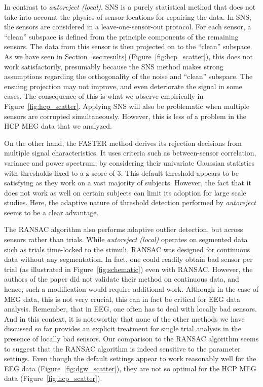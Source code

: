 In contrast to \emph{autoreject (local)}, SNS is a purely statistical method that does not take into account the physics of sensor locations for repairing the data. In SNS, the sensors are considered in a leave-one-sensor-out protocol. For each sensor, a ``clean'' subspace is defined from the principle components of the remaining sensors. The data from this sensor is then projected on to the ``clean'' subspace. As we have seen in Section~\ref{sec:results} (Figure~\ref{fig:hcp_scatter}), this does not work satisfactorily, presumably because the SNS method makes strong assumptions regarding the orthogonality of the noise and ``clean'' subspace. The ensuing projection may not improve, and even deteriorate the signal in some cases. The consequence of this is what we observe empirically in Figure~\ref{fig:hcp_scatter}. Applying SNS will also be problematic when multiple sensors are corrupted simultaneously. However, this is less of a problem in the HCP MEG data that we analyzed. 

On the other hand, the FASTER method derives its rejection decisions from multiple signal characteristics. It uses criteria such as between-sensor correlation, variance and power spectrum, by considering their univariate Gaussian statistics with thresholds fixed to a z-score of 3. This default threshold appears to be satisfying as they work on a vast majority of subjects. However, the fact that it does not work as well on certain subjects can limit its adoption for large scale studies. Here, the adaptive nature of threshold detection performed by \emph{autoreject} seems to be a clear advantage.

The RANSAC algorithm also performs adaptive outlier detection, but across sensors rather than trials. While \emph{autoreject (local)} operates on segmented data such as trials time-locked to the stimuli, RANSAC was designed for continuous data without any segmentation. In fact, one could readily obtain bad sensor per trial (as illustrated in Figure~\ref{fig:schematic}) even with RANSAC. However, the authors of the paper did not validate their method on continuous data, and hence, such a modification would require additional work. Although in the case of MEG data, this is not very crucial, this can in fact be critical for EEG data analysis. Remember, that in EEG, one often has to deal with locally bad sensors. And in this context, it is noteworthy that none of the other methods we have discussed so far provides an explicit treatment for single trial analysis in the presence of locally bad sensors. Our comparison to the RANSAC algorithm seems to suggest that the RANSAC algorithm is indeed sensitive to the parameter settings. Even though the default settings appear to work reasonably well for the EEG data (Figure~\ref{fig:dgw_scatter}), they are not so optimal for the HCP MEG data (Figure~\ref{fig:hcp_scatter}).

